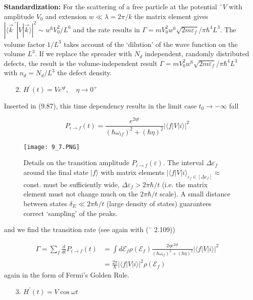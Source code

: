 \textbf{Standardization:} For the scattering of a free particle at the potential ¨$ V$ with amplitude $V_0$ and extension $w \ll\lambda = 2\pi / k$ the matrix element gives $|\langle\vec{k}^{\; \prime}|V|\vec{k}\rangle|^2\sim w^6V_0^2/L^6 $ and the rate results in $\Gamma=mV_0^2w^6\sqrt{2m\varepsilon_f}/\pi\hbar^4L^3$. The volume factor $1 / L^3$ takes account of the  `dilution' of the wave function on the volume $L^3$. If we replace the spreader with $N_d$ independent, randomly distributed defects, the result is the volume-independent result $\Gamma=mV_0^2w^6\sqrt{2m\varepsilon_f}/\pi\hbar^4L^3$ with $ n_d = N_d / L^3$ the defect density.
\begin{enumerate}
    \item[2.]$
    H^{\prime}(t)=V e^{\eta t}, \quad \eta \rightarrow 0^{+}
$
\end{enumerate}

Inserted in (9.87), this time dependency results in the limit case $t_0\rightarrow -\infty$ fall

\begin{equation}
    P_{i \rightarrow f}(t)=\frac{e^{2 \eta t}}{\left(\hbar \omega_{i f}\right)^{2}+(\hbar \eta)^{2}}|\langle f|V| i\rangle|^{2}
    \end{equation}
\begin{figure}[ht]
        \centering
        \texttt{[image: 9\_7.PNG]}
        \caption{Details on the transition amplitude $P_{i\rightarrow f}(\varepsilon)$. The interval $\Delta\varepsilon_f$ around the final state $| f\rangle$ with matrix elements $| \langle f | V | i\rangle_{\varepsilon_f \in [\Delta \varepsilon_f]} \approx$ const. must be sufficiently wide, $\Delta \varepsilon_f > 2\pi\hbar/t$ (i.e. the matrix element must not change much on the $2\pi\hbar/t$ scale). A small distance between states $\delta_E\ll 2\pi\hbar/t$ (large density of states) guarantees correct ‘sampling’ of the peaks.}
\end{figure}

and we find the transition rate (see again with (¨ 2.109))

\begin{equation}
\begin{aligned} \Gamma=\sum_{f} \frac{d}{d t} P_{i \rightarrow f}(t) &=\int d \mathcal{E}_{f} \rho\left(\mathcal{E}_{f}\right) \frac{2 \eta e^{2 \eta t}}{\left(\hbar \omega_{i f}\right)^{2}+(\hbar \eta)^{2}}|\langle f|V| i\rangle|^{2} \\ &=\frac{2 \pi}{\hbar}|\langle f|V| i\rangle|^{2} \rho\left(\mathcal{E}_{f}\right) \end{aligned}
\end{equation}
again in the form of Fermi's Golden Rule.
\begin{enumerate}
    \item[3.] $ H^{\prime}(t)=V \cos \omega t
    $
\end{enumerate}

